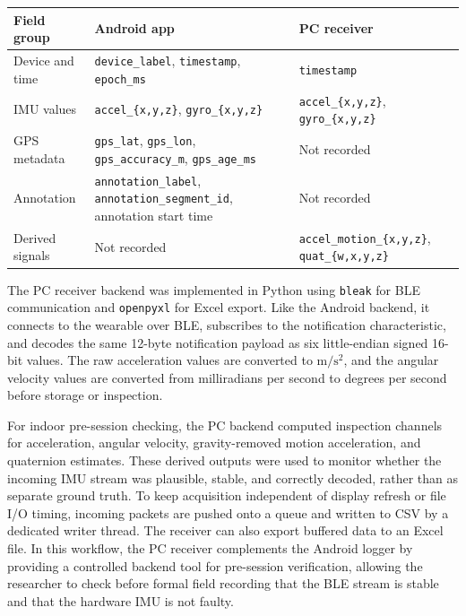 \begin{strip}
    \begin{minipage}{\textwidth}
        \centering
        \small
        \label{tab:receiver_csv_groups}
        \begin{tabularx}{\textwidth}{@{}p{}p{}X@{}}
            \toprule
            Field group & Android app & PC receiver \\
            \midrule
            Device and time & \texttt{device\_label}, \texttt{timestamp}, \texttt{epoch\_ms} & \texttt{timestamp} \\
            IMU values & \texttt{accel\_\{x,y,z\}}, \texttt{gyro\_\{x,y,z\}} & \texttt{accel\_\{x,y,z\}}, \texttt{gyro\_\{x,y,z\}} \\
            GPS metadata & \texttt{gps\_lat}, \texttt{gps\_lon}, \texttt{gps\_accuracy\_m}, \texttt{gps\_age\_ms} & Not recorded \\
            Annotation & \texttt{annotation\_label}, \texttt{annotation\_segment\_id}, annotation start time & Not recorded \\
            Derived signals & Not recorded & \texttt{accel\_motion\_\{x,y,z\}}, \texttt{quat\_\{w,x,y,z\}} \\
            \bottomrule
        \end{tabularx}
        \vspace{0.6em}
    \end{minipage}
\end{strip}

The PC receiver backend was implemented in Python using \texttt{bleak} for BLE communication and \texttt{openpyxl} for Excel export. Like the Android backend, it connects to the wearable over BLE, subscribes to the notification characteristic, and decodes the same 12-byte notification payload as six little-endian signed 16-bit values. The raw acceleration values are converted to \(\si{\meter\per\second\squared}\), and the angular velocity values are converted from milliradians per second to degrees per second before storage or inspection.

For indoor pre-session checking, the PC backend computed inspection channels for acceleration, angular velocity, gravity-removed motion acceleration, and quaternion estimates. These derived outputs were used to monitor whether the incoming IMU stream was plausible, stable, and correctly decoded, rather than as separate ground truth. To keep acquisition independent of display refresh or file I/O timing, incoming packets are pushed onto a queue and written to CSV by a dedicated writer thread. The receiver can also export buffered data to an Excel file. In this workflow, the PC receiver complements the Android logger by providing a controlled backend tool for pre-session verification, allowing the researcher to check before formal field recording that the BLE stream is stable and that the hardware IMU is not faulty.

